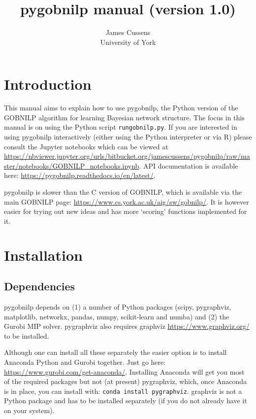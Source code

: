 \documentclass{article}
\title{pygobnilp manual (version 1.0)}
\author{James Cussens\\University of York}
\newcommand{\pygobnilp}{\textsf{pygobnilp}}
\begin{document}
\maketitle

\tableofcontents

\section{Introduction}
\label{sec:intro}

This manual aims to explain how to use \pygobnilp{}, the Python
version of the GOBNILP algorithm for learning Bayesian network
structure. The focus in this manual is on using the Python script
\texttt{rungobnilp.py}. If you are interested in using \pygobnilp{}
interactively (either using the Python interpreter or via R) please
consult the Jupyter notebooks which can be viewed at
\url{https://nbviewer.jupyter.org/urls/bitbucket.org/jamescussens/pygobnilp/raw/master/notebooks/GOBNILP_notebooks.ipynb}.
API documentation is available here:
\url{https://pygobnilp.readthedocs.io/en/latest/}.

\pygobnilp{} is slower than the C version of GOBNILP, which is
available via the main GOBNILP page:
\url{https://www.cs.york.ac.uk/aig/sw/gobnilp/}. It is however easier for
trying out new ideas and has more `scoring' functions implemented for it.

\section{Installation}
\label{sec:installation}

\subsection{Dependencies}
\label{sec:dependencies}

\pygobnilp{} depends on (1) a number of Python packages (scipy,
pygraphviz, matplotlib, networkx, pandas, numpy, scikit-learn and
numba) and (2) the Gurobi MIP solver. pygraphviz also requires
graphviz \url{https://www.graphviz.org/} to be installed.

Although one can install all these separately the easier option is to
install Anaconda Python and Gurobi together. Just go here:
\url{https://www.gurobi.com/get-anaconda/}. Installing Anaconda will
get you most of the required packages but not (at present) pygraphviz,
which, once Anaconda is in place, you can install with: \texttt{conda
  install pygraphviz}. graphviz is not a Python package and has to be
installed separately (if you do not already have it on your system).
\end{document}
